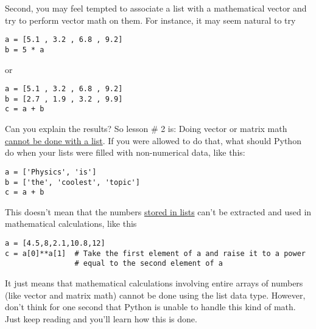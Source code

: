 Second, you may feel tempted to associate a list with a mathematical
vector and try to perform vector math on them. For instance, it may
seem natural to try
\begin{Verbatim}
a = [5.1 , 3.2 , 6.8 , 9.2]
b = 5 * a
\end{Verbatim}
or
\begin{Verbatim}
a = [5.1 , 3.2 , 6.8 , 9.2]
b = [2.7 , 1.9 , 3.2 , 9.9]
c = a + b
\end{Verbatim}
Can you explain the results?  So lesson \# 2 is: Doing vector or
matrix math \underline{cannot be done with a list}.  If you were
allowed to do that, what should Python do when your lists were filled
with non-numerical data, like this:
\begin{Verbatim}
a = ['Physics', 'is']
b = ['the', 'coolest', 'topic']
c = a + b
\end{Verbatim}
  This doesn't mean that the numbers \ul{stored in
  lists} can't be extracted and used in mathematical calculations,
like this
\begin{Verbatim}
a = [4.5,8,2.1,10.8,12]
c = a[0]**a[1]  # Take the first element of a and raise it to a power
                # equal to the second element of a
\end{Verbatim}
It just means that mathematical calculations involving entire arrays
of numbers (like vector and matrix math) cannot be done using the list
data type.  However, don't think for one second that Python is unable
to handle this kind of math.  Just keep reading and you'll learn how
this is done.
